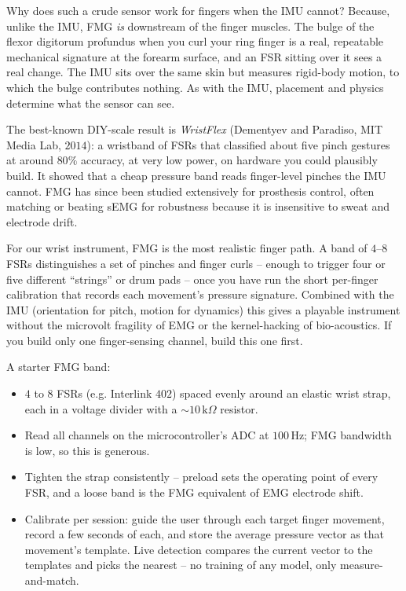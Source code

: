 \begin{whybox}
Why does such a crude sensor work for fingers when the IMU cannot? Because, unlike the
IMU, FMG \emph{is} downstream of the finger muscles. The bulge of the flexor
digitorum profundus when you curl your ring finger is a real, repeatable mechanical
signature at the forearm surface, and an FSR sitting over it sees a real change. The
IMU sits over the same skin but measures rigid-body motion, to which the bulge
contributes nothing. As with the IMU, placement and physics determine what the sensor can see.
\end{whybox}

\begin{applicationbox}
The best-known DIY-scale result is \emph{WristFlex} (Dementyev and Paradiso, MIT Media
Lab, $2014$): a wristband of FSRs that classified about five pinch gestures at around
$80\%$ accuracy, at very low power, on hardware you could plausibly build. It showed
that a cheap pressure band reads finger-level pinches the IMU
cannot. FMG has since been studied extensively for prosthesis control, often matching
or beating sEMG for robustness because it is insensitive to sweat and electrode drift.
\end{applicationbox}

\begin{goalbox}
For our wrist instrument, FMG is the most realistic finger path. A band of $4$--$8$
FSRs distinguishes a set of pinches and finger curls -- enough to
trigger four or five different ``strings'' or drum pads -- once you have run the short
per-finger calibration that records each movement's pressure signature. Combined with
the IMU (orientation for pitch, motion for dynamics) this gives a playable
instrument without the microvolt fragility of EMG or the kernel-hacking of
bio-acoustics. If you build only one finger-sensing channel, build this one first.
\end{goalbox}

\begin{buildbox}
A starter FMG band:
\begin{itemize}
\item $4$ to $8$ FSRs (e.g. Interlink $402$) spaced evenly around an elastic wrist
strap, each in a voltage divider with a $\sim 10\,\text{k}\Omega$ resistor.
\item Read all channels on the microcontroller's ADC at $100$\,Hz; FMG bandwidth is
low, so this is generous.
\item Tighten the strap consistently -- preload sets the operating point of every FSR,
and a loose band is the FMG equivalent of EMG electrode shift.
\item Calibrate per session: guide the user through each target finger movement,
record a few seconds of each, and store the average pressure vector as that
movement's template. Live detection compares the current vector to the templates and
picks the nearest -- no training of any model, only measure-and-match.
\end{itemize}
\end{buildbox}

